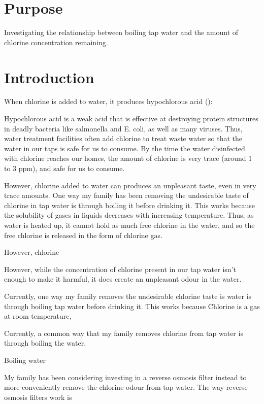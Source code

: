 \documentclass[12pt, demo]{article}
\begin{document}
\section*{Purpose}
Investigating the relationship between boiling tap water and the amount of chlorine concentration remaining.

\section*{Introduction}

When chlorine is added to water, it produces hypochlorous acid ():

\centerline{}

Hypochlorous acid is a weak acid that is effective at destroying protein structures in deadly bacteria like salmonella and E. coli, as well as many viruses. Thus, water treatment facilities often add chlorine to treat waste water so that the water in our taps is safe for us to consume. By the time the water disinfected with chlorine reaches our homes, the amount of chlorine is very trace (around 1 to 3 ppm), and safe for us to consume.

However, chlorine added to water can produces an unpleasant taste, even in very trace amounts. One way my family has been removing the undesirable taste of chlorine in tap water is through boiling it before drinking it. This works because the solubility of gases in liquids decreases with increasing temperature. Thus, as water is heated up, it cannot hold as much free chlorine in the water, and so the free chlorine is released in the form of chlorine gas.


However, chlorine

However, while the concentration of chlorine present in our tap water isn't enough to make it harmful, it does create an unpleasant odour in the water.

Currently, one way my family removes the undesirable chlorine taste is water is through boiling tap water before drinking it. This works because Chlorine is a gas at room temperature,

Currently, a common way that my family removes chlorine from tap water is through boiling the water.

Boiling water

My family has been considering investing in a reverse osmosis filter instead to more conveniently remove the chlorine odour from tap water. The way reverse osmosis filters work is
\end{document}
